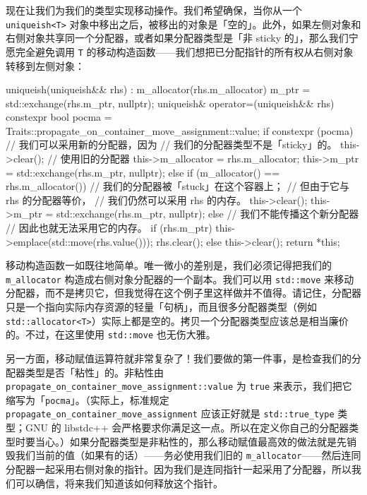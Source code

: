 现在让我们为我们的类型实现移动操作。我们希望确保，当你从一个 \texttt{uniqueish<\allowbreak{}T>\allowbreak{}} 对象中移出之后，被移出的对象是「空的」。此外，如果左侧对象和右侧对象共享同一个分配器，或者如果分配器类型是「非 sticky 的」，那么我们宁愿完全避免调用 \texttt{T} 的移动构造函数——我们想把已分配指针的所有权从右侧对象转移到左侧对象：

\begin{codebox}[cpp]
    uniqueish(uniqueish&& rhs) : m_allocator(rhs.m_allocator)
    {
      m_ptr = std::exchange(rhs.m_ptr, nullptr);
    }
    uniqueish& operator=(uniqueish&& rhs)
    {
      constexpr bool pocma =
        Traits::propagate_on_container_move_assignment::value;
      if constexpr (pocma) {
        // 我们可以采用新的分配器，因为
        // 我们的分配器类型不是「sticky」的。
        this->clear(); // 使用旧的分配器
        this->m_allocator = rhs.m_allocator;
        this->m_ptr = std::exchange(rhs.m_ptr, nullptr);
      } else if (m_allocator() == rhs.m_allocator()) {
        // 我们的分配器被「stuck」在这个容器上；
        // 但由于它与 rhs 的分配器等价，
        // 我们仍然可以采用 rhs 的内存。
        this->clear();
        this->m_ptr = std::exchange(rhs.m_ptr, nullptr);
      } else {
        // 我们不能传播这个新分配器
        // 因此也就无法采用它的内存。
        if (rhs.m_ptr) {
          this->emplace(std::move(rhs.value()));
          rhs.clear();
        } else {
          this->clear();
        }
      }
      return *this;
    }
\end{codebox}

移动构造函数一如既往地简单。唯一微小的差别是，我们必须记得把我们的 \texttt{m\_\allowbreak{}allocator} 构造成右侧对象分配器的一个副本。我们可以用 \texttt{std::\allowbreak{}move} 来移动分配器，而不是拷贝它，但我觉得在这个例子里这样做并不值得。请记住，分配器只是一个指向实际内存资源的轻量「句柄」，而且很多分配器类型（例如 \texttt{std::\allowbreak{}allocator<\allowbreak{}T>\allowbreak{}}）实际上都是空的。拷贝一个分配器类型应该总是相当廉价的。不过，在这里使用 \texttt{std::\allowbreak{}move} 也无伤大雅。

另一方面，移动赋值运算符就非常复杂了！我们要做的第一件事，是检查我们的分配器类型是否「粘性」的。非粘性由 \texttt{propagate\_\allowbreak{}on\_\allowbreak{}container\_\allowbreak{}move\_\allowbreak{}assignment::\allowbreak{}value} 为 \texttt{true} 来表示，我们把它缩写为「\texttt{pocma}」。（实际上，标准规定 \texttt{propagate\_\allowbreak{}on\_\allowbreak{}container\_\allowbreak{}move\_\allowbreak{}assignment} 应该正好就是 \texttt{std::\allowbreak{}true\_\allowbreak{}type} 类型；GNU 的 libstdc++ 会严格要求你满足这一点。所以在定义你自己的分配器类型时要当心。）如果分配器类型是非粘性的，那么移动赋值最高效的做法就是先销毁我们当前的值（如果有的话）——务必使用我们旧的 \texttt{m\_\allowbreak{}allocator}——然后连同分配器一起采用右侧对象的指针。因为我们是连同指针一起采用了分配器，所以我们可以确信，将来我们知道该如何释放这个指针。

